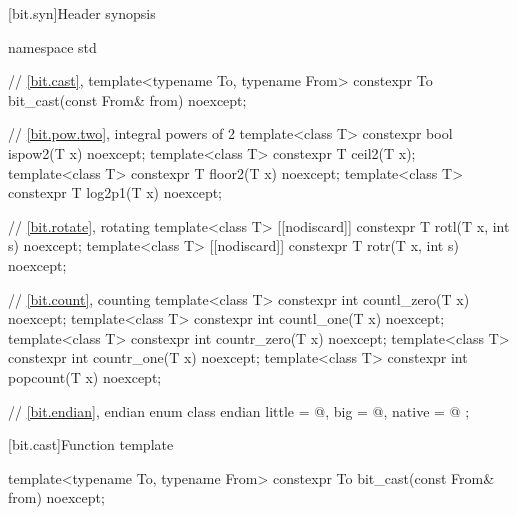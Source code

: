 [bit.syn]{Header  synopsis}
%
\begin{codeblock}
namespace std {
  // \ref{bit.cast}, 
  template<typename To, typename From>
    constexpr To bit_cast(const From& from) noexcept;

  // \ref{bit.pow.two}, integral powers of 2
  template<class T>
    constexpr bool ispow2(T x) noexcept;
  template<class T>
    constexpr T ceil2(T x);
  template<class T>
    constexpr T floor2(T x) noexcept;
  template<class T>
    constexpr T log2p1(T x) noexcept;

  // \ref{bit.rotate}, rotating
  template<class T>
    [[nodiscard]] constexpr T rotl(T x, int s) noexcept;
  template<class T>
    [[nodiscard]] constexpr T rotr(T x, int s) noexcept;

  // \ref{bit.count}, counting
  template<class T>
    constexpr int countl_zero(T x) noexcept;
  template<class T>
    constexpr int countl_one(T x) noexcept;
  template<class T>
    constexpr int countr_zero(T x) noexcept;
  template<class T>
    constexpr int countr_one(T x) noexcept;
  template<class T>
    constexpr int popcount(T x) noexcept;

  // \ref{bit.endian}, endian
  enum class endian {
    little = @\seebelow@,
    big    = @\seebelow@,
    native = @\seebelow@
  };
}
\end{codeblock}

[bit.cast]{Function template }

%
\begin{itemdecl}
template<typename To, typename From>
  constexpr To bit_cast(const From& from) noexcept;
\end{itemdecl}

